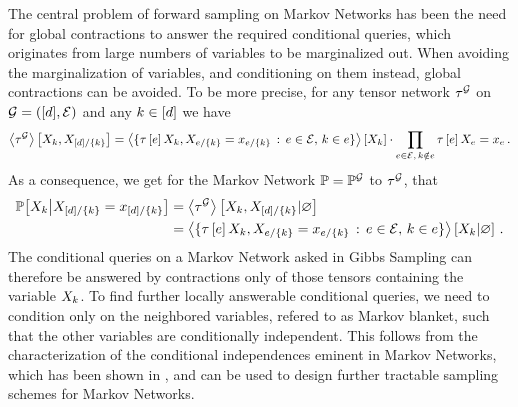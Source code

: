 The central problem of forward sampling on Markov Networks has been the need for global contractions to answer the required conditional queries, which originates from large numbers of variables to be marginalized out.
When avoiding the marginalization of variables, and conditioning on them instead, global contractions can be avoided.
To be more precise, for any tensor network $\tau^{\mathcal{G}}$ on $\mathcal{G}=([d],\mathcal{E})$ and any $k\in[d]$ we have
\begin{align*}
    \left\langle \tau^{\mathcal{G}}\right\rangle \left[ X_{k},X_{[d]/\{k\}} \right]
    = \left\langle \{\tau\left[e\right]{X_{k},X_{e/\{k\}}=x_{e/\{k\}}} \, : \, e\in\mathcal{E}, \, k\in e\}\right\rangle \left[ X_{k} \right]
    \cdot \prod_{e\in\mathcal{E}, \, k\notin e} \tau\left[e\right]{X_{e}=x_{e}} \, .
\end{align*}
As a consequence, we get for the Markov Network $\mathbb{P}=\mathbb{P}^{\mathcal{G}}$ to $\tau^{\mathcal{G}}$, that
\begin{align*}
    \mathbb{P}\big[X_{k}\big|X_{[d]/\{k\}}=x_{[d]/\{k\}}\big]
    &= \left\langle \tau^{\mathcal{G}}\right\rangle \left[ X_{k},X_{[d]/\{k\}} | \varnothing \right] \\
    &= \left\langle \{\tau\left[e\right]{X_{k},X_{e/\{k\}}=x_{e/\{k\}}} \, : \, e\in\mathcal{E}, \, k\in e\}\right\rangle \left[ X_{k} | \varnothing \right] \, .
\end{align*}
The conditional queries on a Markov Network asked in Gibbs Sampling can therefore be answered by contractions only of those tensors containing the variable $X_{k}$.
To find further locally answerable conditional queries, we need to condition only on the neighbored variables, refered to as Markov blanket, such that the other variables are conditionally independent.
This follows from the characterization of the conditional independences eminent in Markov Networks, which has been shown in , and can be used to design further tractable sampling schemes for Markov Networks.

